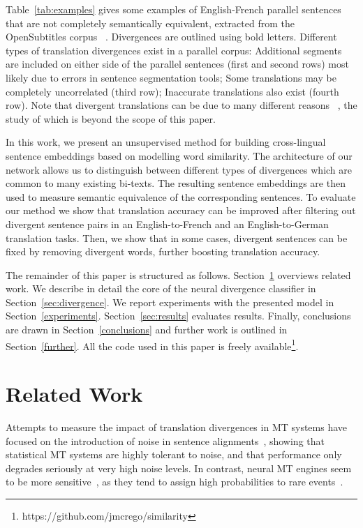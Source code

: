 \documentclass[11pt,a4paper]{article}
\begin{document}
Table~\ref{tab:examples} gives some examples of English-French parallel sentences that are not completely semantically equivalent, extracted from the OpenSubtitles corpus ~\cite{LisonTiedemann2016}. 
Divergences are outlined using bold letters. 
Different types of translation divergences exist in a parallel corpus:
Additional segments are included on either side of the parallel sentences (first and second rows) most likely due to errors in sentence segmentation tools;
Some translations may be completely uncorrelated (third row);
Inaccurate translations also exist (fourth row). 
Note that divergent translations can be due to many different reasons ~\cite{C14-1055}, the study of which is beyond the scope of this paper. 

In this work, we present an unsupervised method for building cross-lingual sentence embeddings based on modelling word similarity. %
The architecture of our network allows us to distinguish between different types of divergences which are common to many existing bi-texts.
The resulting sentence embeddings are then used to measure semantic equivalence of the corresponding sentences.
To evaluate our method we show that translation accuracy can be improved after filtering out divergent sentence pairs in an English-to-French and an English-to-German translation tasks.
Then, we  show that in some cases, divergent sentences can be fixed by removing divergent words, further boosting translation accuracy.

The remainder of this paper is structured as follows. 
Section~\ref{related} overviews related work. 
We describe in detail the core of the neural divergence classifier in Section~\ref{sec:divergence}. 
We report experiments with the presented model in Section~\ref{experiments}.
Section~\ref{sec:results} evaluates results. 
Finally, conclusions are drawn in Section~\ref{conclusions} and further work is outlined in Section~\ref{further}.
All the code used in this paper is freely available\footnote{https://github.com/jmcrego/similarity}.


\section{Related Work}
\label{related}

Attempts to measure the impact of translation divergences in MT systems have focused on the introduction of noise in sentence alignments~\cite{goute2012}, showing that statistical MT systems are highly tolerant to noise, and that performance only degrades seriously at very high noise levels. 
In contrast, neural MT engines seem to be more sensitive~\cite{chen2016adaptation}, as they tend to assign high probabilities to rare events~\cite{Hassan2018AchievingHP}.
\end{document}
